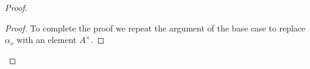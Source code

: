 \begin{proof}
\begin{proof}
  To complete the proof we repeat the argument of the base case to replace $\alpha_o$ with an element $A^\times$.
\end{proof}



\end{proof}
